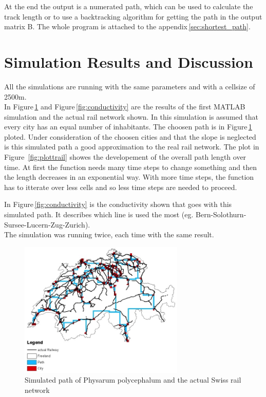 \documentclass[11pt]{scrartcl}
\begin{document}
\null

At the end the output is a numerated path, which can be used to calculate the track length or to use a backtracking algorithm for getting the path in the output matrix B. The whole program is attached to the appendix\,\ref{sec:shortest_path}.



\section{Simulation Results and Discussion}
\label{sec:results}
All the simulations are running with the same parameters and with a cellsize of 2500m.
\\

In Figure\,\ref{fig:path} and Figure\,\ref{fig:conductivity} are the results of the first MATLAB simulation and the actual rail network shown. In this simulation is assumed that every city has an equal number of inhabitants. The choosen path is in Figure\,\ref{fig:path} ploted. Under consideration of the choosen cities and that the slope is neglected is this simulated path a good approximation to the real rail network. The plot in Figure \,\ref{fig:plottrail} showes the developement of the overall path length over time. At first the function needs many time steps to change something and then the length decreases in an exponential way. With more time steps,  the function has to itterate over less cells and so less time steps are needed to proceed.

In Figure\,\ref{fig:conductivity} is the conductivity shown that goes with this simulated path. It describes which line is used the most (eg. Bern-Solothurn-Sursee-Lucern-Zug-Zurich).
\\

The simulation was running twice, each time with the same result.



\begin{figure}[H]
	\centering
	\includegraphics[width=0.7\textwidth]{figures/path_railway}
	\caption{Simulated path of Physarum polycephalum and the actual Swiss rail network}
	\label{fig:path}
\end{figure}
\end{document}

